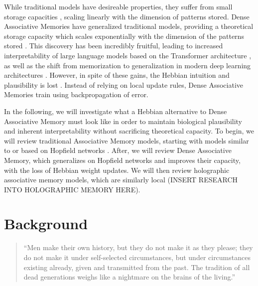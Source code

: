 \documentclass{article}
\theoremstyle{definition}
\begin{document}
While traditional models have desireable properties, they suffer from small 
storage capacities \parencites{hopfield_neural_1982,amit_storing_1985},
scaling linearly with the dimension of patterns stored. Dense
Associative Memories have generalized traditional models, providing a theoretical
storage capacity which scales exponentially with the dimension of the patterns
stored \parencites{krotov_dense_2016,demircigil_model_2017}. This discovery
has been incredibly fruitful, leading to increased interpretability of 
large language models based on the Transformer architecture 
\parencites{vaswani_attention_2023,ramsauer_hopfield_2021}, as well as the shift
from memorization to generalization in modern deep learning architectures
\parencite{pham_memorization_2025}. However, in spite of these gains, the Hebbian
intuition and plausibility is lost \parencite{mcalister_sequential_2025}. 
Instead of relying on local update rules, Dense Associative Memories
train using backpropagation of error. 

In the following, we will investigate what a Hebbian alternative to Dense
Associative Memory must look like in order to maintain biological plausibility
and inherent interpretability without sacrificing theoretical capacity. To begin,
we will review traditional Associative Memory models, starting with 
models similar to or based on Hopfield networks \parencite{hopfield_neural_1982}.
After, we will review Dense Associative Memory, which generalizes on Hopfield
networks and improves their capacity, with the loss of Hebbian weight updates.
We will then review holographic associative memory models, which are 
similarly local (INSERT RESEARCH INTO HOLOGRAPHIC MEMORY HERE). 


\section{Background}

\begin{quote}
    ``Men make their own history, but they do not make it as they please; they 
    do not make it under self-selected circumstances, but under circumstances 
    existing already, given and transmitted from the past. The tradition of all 
    dead generations weighs like a nightmare on the brains of the living.''
    \parencite{marx_eighteenth_1852}
\end{quote}
\end{document}
